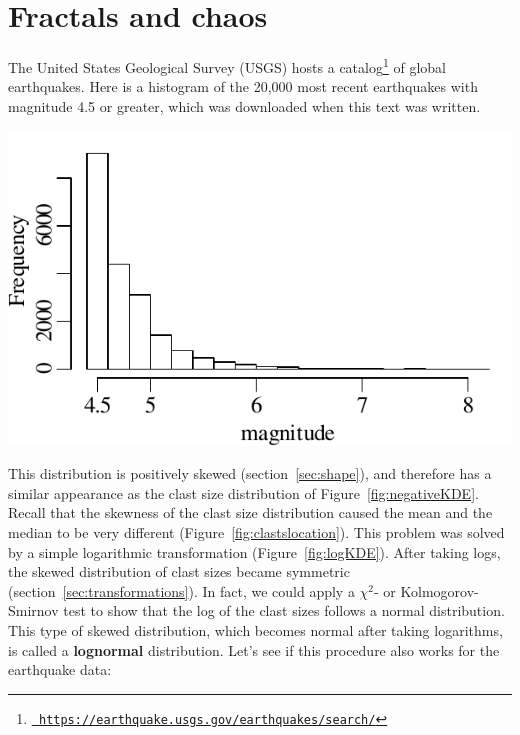 \chapter{Fractals and chaos}
\label{ch:fractals}

The United States Geological Survey (USGS) hosts a
catalog\footnote{\href{https://earthquake.usgs.gov/earthquakes/search/}{\tt
    https://earthquake.usgs.gov/earthquakes/search/}} of global
earthquakes. Here is a histogram of the 20,000 most recent earthquakes
with magnitude 4.5 or greater, which was downloaded when this text was
written.

\noindent\begin{minipage}[t][][b]{.4\textwidth}
  \includegraphics[width=\textwidth]{../figures/recentquakes.pdf}\medskip
\end{minipage}
\begin{minipage}[t][][t]{.6\textwidth}
  \label{fig:recentquakes}
\end{minipage}

This distribution is positively skewed (section~\ref{sec:shape}), and
therefore has a similar appearance as the clast size distribution of
Figure~\ref{fig:negativeKDE}. Recall that the skewness of the clast
size distribution caused the mean and the median to be very different
(Figure~\ref{fig:clastslocation}). This problem was solved by a simple
logarithmic transformation (Figure~\ref{fig:logKDE}). After taking
logs, the skewed distribution of clast sizes became symmetric
(section~\ref{sec:transformations}).  In fact, we could apply a
$\chi^2$- or Kolmogorov-Smirnov test to show that the log of the clast
sizes follows a normal distribution.  This type of skewed
distribution, which becomes normal after taking logarithms, is called
a \textbf{lognormal} distribution. Let's see if this procedure also
works for the earthquake data:\medskip

